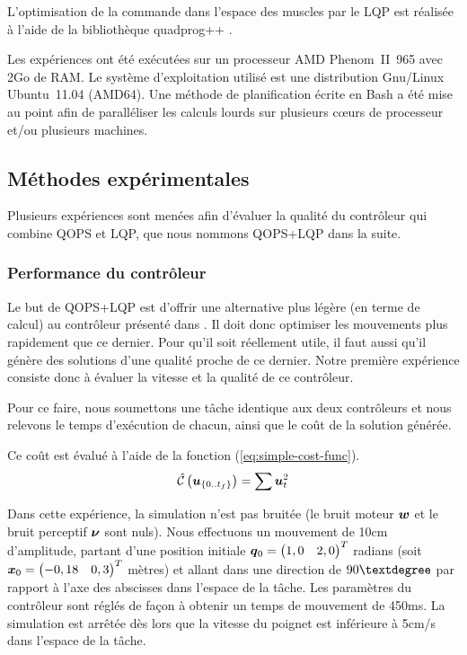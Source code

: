\documentclass[pdftex,a4paper,11pt]{article}
\begin{document}
L'optimisation de la commande dans l'espace des muscles par le LQP est réalisée à l'aide
de la bibliothèque quadprog++ \cite{quadprog}.

Les expériences ont été exécutées sur un processeur AMD Phenom~II~965 avec
2Go de RAM.  Le système d'exploitation utilisé est une distribution Gnu/Linux
Ubuntu~11.04 (AMD64).
Une méthode de planification écrite en Bash a été mise au point afin de
paralléliser les calculs \og{}lourds\fg{} sur plusieurs cœurs de processeur
et/ou plusieurs machines.


\subsection{Méthodes expérimentales}

Plusieurs expériences sont menées afin d'évaluer la qualité du
contrôleur qui combine QOPS et LQP, que nous nommons QOPS+LQP
dans la suite.


\subsubsection{Performance du contrôleur}

Le but de QOPS+LQP est d'offrir une alternative plus légère (en
terme de calcul) au contrôleur présenté dans \cite{rigoux11}.
Il doit donc optimiser les mouvements plus rapidement que ce dernier.
Pour qu'il soit réellement utile, il faut
aussi qu'il génère des solutions d'une qualité proche de ce dernier. Notre
première expérience consiste donc à évaluer la vitesse et la qualité de
ce contrôleur.

Pour ce faire, nous soumettons une tâche identique aux deux
contrôleurs et nous relevons le temps d'exécution de chacun, ainsi que
le coût de la solution générée.

Ce coût est évalué à l'aide de la fonction (\ref{eq:simple-cost-func}).
\begin{equation}
    \label{eq:simple-cost-func}
    \hat{\mathcal{C}}\left(\boldsymbol{u}_{\{0..t_f\}}\right) = \sum \boldsymbol{u}_t^2
\end{equation}

Dans cette expérience, la simulation n'est pas bruitée (le bruit moteur
$\boldsymbol{w}$ et le bruit perceptif $\boldsymbol{\nu}$ sont nuls).
Nous effectuons un mouvement de 10cm d'amplitude, partant
d'une position initiale $\boldsymbol{q}{}_0 = \begin{pmatrix} 1,0 & 2,0 \end{pmatrix}^T$ radians
(soit $\boldsymbol{x}{}_0 = \begin{pmatrix} -0,18 & 0,3 \end{pmatrix}^T$ mètres) et allant dans une direction de $90\textdegree$ par rapport à l'axe
des abscisses dans l'espace de la tâche.
Les paramètres du contrôleur sont réglés de façon à obtenir un temps de
mouvement de 450ms.
La simulation est arrêtée dès lors que la vitesse du poignet est inférieure à
5cm/s dans l'espace de la tâche.
\end{document}
